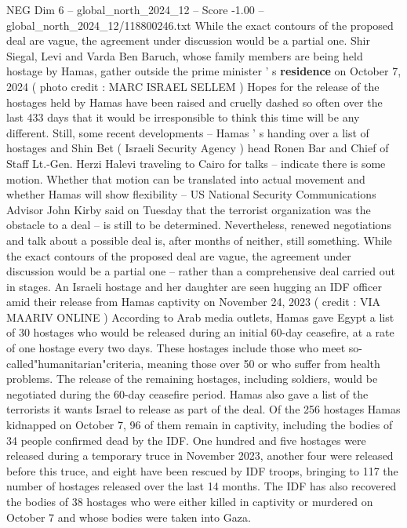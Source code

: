\begin{textsample}{NEG Dim 6 – global\_north\_2024\_12 – Score -1.00 – global\_north\_2024\_12/118800246.txt}  \label{ex:f6_neg_194}
While the exact contours of the proposed deal are vague, the agreement under discussion would be a partial one.
Shir Siegal, Levi and Varda Ben Baruch, whose family members are being held hostage by Hamas, gather outside the prime minister ' s \textbf{residence} on October 7, 2024 ( photo credit : MARC ISRAEL SELLEM ) Hopes for the release of the hostages held by Hamas have been raised and cruelly dashed so often over the last 433 days that it would be irresponsible to think this time will be any different.
Still, some recent developments -- Hamas ' s handing over a list of hostages and Shin Bet ( Israeli Security Agency ) head Ronen Bar and Chief of Staff Lt.-Gen.
Herzi Halevi traveling to Cairo for talks -- indicate there is some motion.
Whether that motion can be translated into actual movement and whether Hamas will show flexibility -- US National Security Communications Advisor John Kirby said on Tuesday that the terrorist organization was the obstacle to a deal -- is still to be determined.
Nevertheless, renewed negotiations and talk about a possible deal is, after months of neither, still something.
While the exact contours of the proposed deal are vague, the agreement under discussion would be a partial one -- rather than a comprehensive deal carried out in stages.
An Israeli hostage and her daughter are seen hugging an IDF officer amid their release from Hamas captivity on November 24, 2023 ( credit : VIA MAARIV ONLINE ) According to Arab media outlets, Hamas gave Egypt a list of 30 hostages who would be released during an initial 60-day ceasefire, at a rate of one hostage every two days.
These hostages include those who meet so-called"humanitarian"criteria, meaning those over 50 or who suffer from health problems.
The release of the remaining hostages, including soldiers, would be negotiated during the 60-day ceasefire period.
Hamas also gave a list of the terrorists it wants Israel to release as part of the deal.
Of the 256 hostages Hamas kidnapped on October 7, 96 of them remain in captivity, including the bodies of 34 people confirmed dead by the IDF.
One hundred and five hostages were released during a temporary truce in November 2023, another four were released before this truce, and eight have been rescued by IDF troops, bringing to 117 the number of hostages released over the last 14 months.
The IDF has also recovered the bodies of 38 hostages who were either killed in captivity or murdered on October 7 and whose bodies were taken into Gaza.

\end{textsample}
